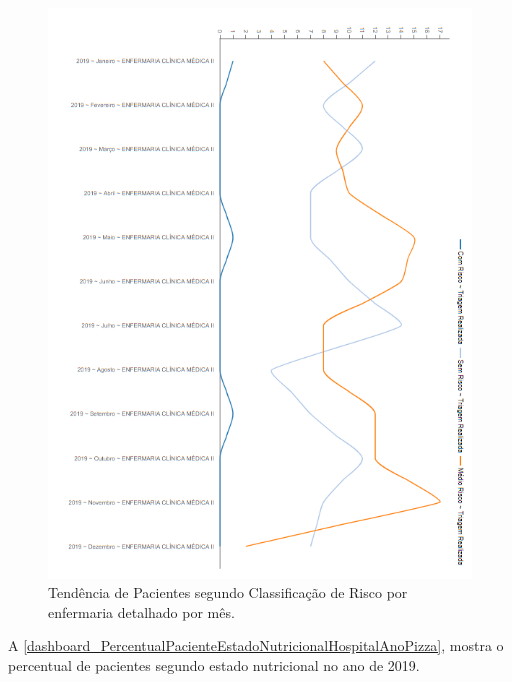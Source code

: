 \begin{figure}[htb]
	\caption{\label{dashboard_PercentualPacientesClassificacaoRiscoEnfermariaMesLinha}Tendência de Pacientes segundo Classificação de Risco por enfermaria detalhado por mês.}
	\begin{center}
	    \includegraphics[scale=0.9]{Imagens/2.4.PercentualPacientesClassificacaoRiscoEnfermariaMesLinha.png}
	\end{center}
\end{figure}

\newpage
A \autoref{dashboard_PercentualPacienteEstadoNutricionalHospitalAnoPizza}, mostra o percentual de pacientes segundo estado nutricional no ano de 2019.


